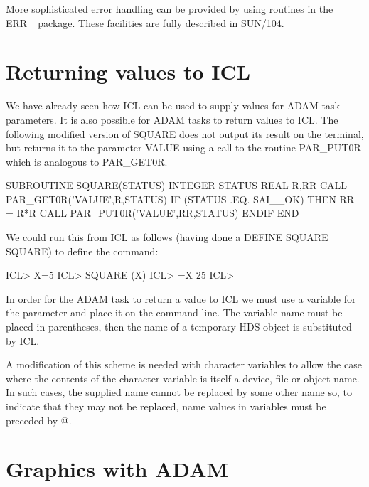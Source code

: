 \documentclass[twoside,11pt,nolof,chapters]{starlink}
\begin{document}
More sophisticated error handling can be provided by using routines in the
ERR\_ package. These facilities are fully described in SUN/104.

\section{Returning values to ICL}
\label{retval}
We have already seen how ICL can be used to supply values for ADAM task
parameters. It is also possible for ADAM tasks to return values to ICL.
The following modified version of SQUARE does not output its result on the
terminal, but returns it to the parameter VALUE using a call to the routine
PAR\_PUT0R which is analogous to PAR\_GET0R.

\begin{terminalv}
      SUBROUTINE SQUARE(STATUS)
      INTEGER STATUS
      REAL R,RR
      CALL PAR_GET0R('VALUE',R,STATUS)
      IF (STATUS .EQ. SAI__OK) THEN
         RR = R*R
         CALL PAR_PUT0R('VALUE',RR,STATUS)
      ENDIF
      END
\end{terminalv}

We could run this from ICL as follows (having done a DEFINE SQUARE SQUARE)
to define the command:

\begin{terminalv}
    ICL> X=5
    ICL> SQUARE (X)
    ICL> =X
    25
    ICL>
\end{terminalv}

In order for the ADAM task to return a value to ICL we must use a variable
for the parameter and place it on the command line. The variable name must
be placed in parentheses, then the name of a temporary HDS object is
substituted by ICL.

A modification of this scheme is needed with character variables to allow the
case where the contents of the character variable is itself a device, file or
object name.
In such cases, the supplied name cannot be replaced by some other name so,
to indicate that they may not be replaced, name values in variables must be
preceded by @.

\section{Graphics with ADAM}
\end{document}
